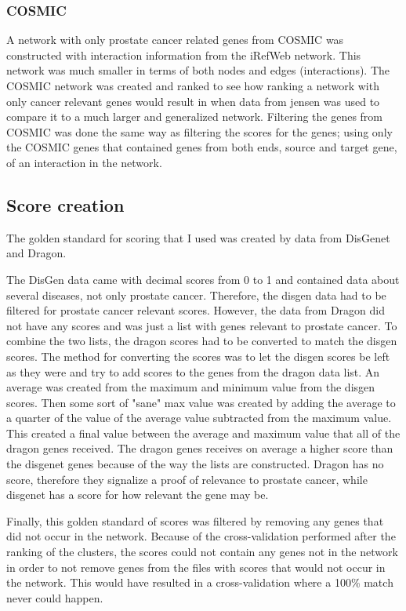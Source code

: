 \subsubsection{COSMIC}
A network with only prostate cancer related genes from
COSMIC\cite{cosmic-download} was constructed with interaction information from
the iRefWeb network. This network was much smaller in terms of both nodes and
edges (interactions). The COSMIC network was created and ranked to see how
ranking a network with only cancer relevant genes would result in when data from
jensen was used to compare it to a much larger and generalized network.
Filtering the genes from COSMIC was done the same way as filtering the scores
for the genes; using only the COSMIC genes that contained genes from both ends,
source and target gene, of an interaction in the network.

\subsection{Score creation}
The golden standard for scoring that I used was created by data from
DisGenet\cite{disgenet} and Dragon\cite{dragon}. 

The DisGen data came with decimal scores from 0 to 1 and contained data about
several diseases, not only prostate cancer. Therefore, the disgen data had to be
filtered for prostate cancer relevant scores. However, the data from Dragon did
not have any scores and was just a list with genes relevant to prostate cancer.
To combine the two lists, the dragon scores had to be converted to match the
disgen scores. The method for converting the scores was to let the disgen scores
be left as they were and try to add scores to the genes from the dragon data
list. An average was created from the maximum and minimum value from the disgen
scores. Then some sort of "sane" max value was created by adding the average to
a quarter of the value of the average value subtracted from the maximum value.
This created a final value between the average and maximum value that all of the
dragon genes received. The dragon genes receives on average a higher score than
the disgenet genes because of the way the lists are constructed. Dragon has no
score, therefore they signalize a proof of relevance to prostate cancer, while
disgenet has a score for how relevant the gene may be.

Finally, this golden standard of scores was filtered by removing any genes that
did not occur in the network. Because of the cross-validation performed after
the ranking of the clusters, the scores could not contain any genes not in the
network in order to not remove genes from the files with scores that would not
occur in the network. This would have resulted in a cross-validation where
a 100\% match never could happen.

